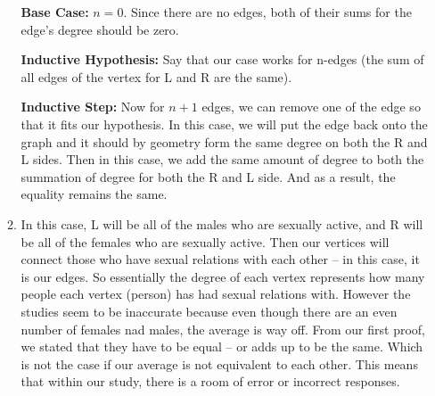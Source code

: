 \documentclass[12pt,fleqn]{article}
\begin{document}
\begin{enumerate}
\begin{enumerate}
    		\textbf{Base Case:} $n = 0$. Since there are no edges, both of their sums for the edge's degree should be zero.
    		
    		\textbf{Inductive Hypothesis:} Say that our case works for n-edges (the sum of all edges of the vertex for L and R are the same). 
    		
    		\textbf{Inductive Step:} Now for $n + 1$ edges, we can remove one of the edge so that it fits our hypothesis. In this case, we will put the edge back onto the graph and it should by geometry form the same degree on both the R and L sides. Then in this case, we add the same amount of degree to both the summation of degree for both the R and L side. And as a result, the equality remains the same. 
    		\item In this case, L will be all of the males who are sexually active, and R will be all of the females who are sexually active. Then our vertices will connect those who have sexual relations with each other -- in this case, it is our edges. So essentially the degree of each vertex represents how many people each vertex (person) has had sexual relations with. However the studies seem to be inaccurate because even though there are an even number of females nad males, the average is way off. From our first proof, we stated that they have to be equal -- or adds up to be the same. Which is not the case if our average is not equivalent to each other. This means that within our study, there is a room of error or incorrect responses. 
    \end{enumerate}
  

\end{enumerate}
\end{document}
